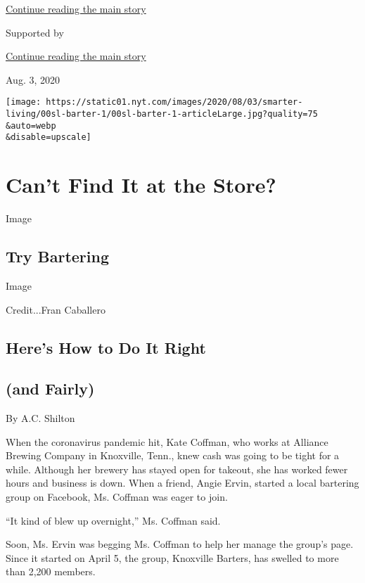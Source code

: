 \protect\hyperlink{after-top}{Continue reading the main story}

Supported by

\protect\hyperlink{after-sponsor}{Continue reading the main story}

Aug. 3, 2020

\texttt{[image: https://static01.nyt.com/images/2020/08/03/smarter-living/00sl-barter-1/00sl-barter-1-articleLarge.jpg?quality=75\\\&auto=webp\\\&disable=upscale]}

\hypertarget{cant-find-it-at-the-store}{%
\section{Can't Find It at the Store?}\label{cant-find-it-at-the-store}}

Image

\hypertarget{try-bartering}{%
\subsection{Try Bartering}\label{try-bartering}}

Image

Credit...Fran Caballero

\hypertarget{heres-how-to-do-it-right}{%
\subsection{Here's How to Do It Right}\label{heres-how-to-do-it-right}}

\hypertarget{and-fairly}{%
\subsection{(and Fairly)}\label{and-fairly}}

By A.C. Shilton

When the coronavirus pandemic hit, Kate Coffman, who works at Alliance
Brewing Company in Knoxville, Tenn., knew cash was going to be tight for
a while. Although her brewery has stayed open for takeout, she has
worked fewer hours and business is down. When a friend, Angie Ervin,
started a local bartering group on Facebook, Ms. Coffman was eager to
join.

``It kind of blew up overnight,'' Ms. Coffman said.

Soon, Ms. Ervin was begging Ms. Coffman to help her manage the group's
page. Since it started on April 5, the group, Knoxville Barters, has
swelled to more than 2,200 members.

